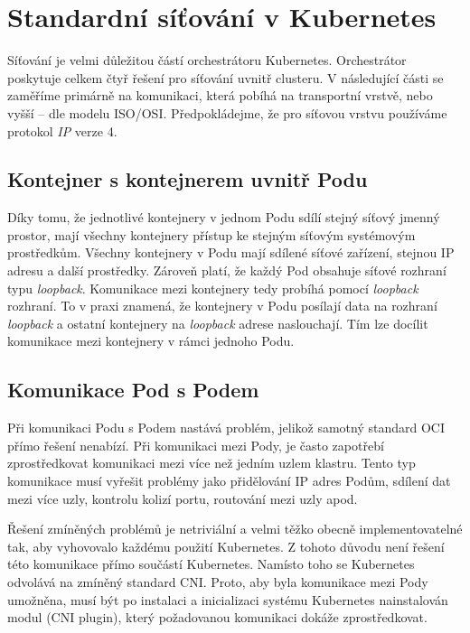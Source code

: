 \section{Standardní síťování v Kubernetes}
Síťování je velmi důležitou částí orchestrátoru Kubernetes. Orchestrátor poskytuje celkem čtyř řešení pro síťování uvnitř clusteru. V následující části se zaměříme primárně na komunikaci, která pobíhá na transportní vrstvě, nebo vyšší -- dle modelu ISO/OSI. Předpokládejme, že pro síťovou vrstvu používáme protokol \textit{IP} verze 4.

\subsection{Kontejner s kontejnerem uvnitř Podu}
Díky tomu, že jednotlivé kontejnery v jednom Podu sdílí stejný síťový jmenný prostor, mají všechny kontejnery přístup ke stejným síťovým systémovým prostředkům. Všechny kontejnery v Podu mají sdílené síťové zařízení, stejnou IP adresu a další prostředky. Zároveň platí, že každý Pod obsahuje síťové rozhraní typu \textit{loopback}. Komunikace mezi kontejnery tedy probíhá pomocí \textit{loopback} rozhraní. To v praxi znamená, že kontejnery v Podu posílají data na rozhraní \textit{loopback} a ostatní kontejnery na \textit{loopback} adrese naslouchají. Tím lze docílit komunikace mezi kontejnery v rámci jednoho Podu.%

\subsection{Komunikace Pod s Podem}
Při komunikaci Podu s Podem nastává problém, jelikož samotný standard OCI přímo řešení nenabízí. Při komunikaci mezi Pody, je často zapotřebí zprostředkovat komunikaci mezi více než jedním uzlem klastru.
Tento typ komunikace musí vyřešit problémy jako přidělování IP adres Podům, sdílení dat mezi více uzly, kontrolu kolizí portu, routování mezi uzly apod.

Řešení zmíněných problémů je netriviální a velmi těžko obecně implementovatelné tak, aby vyhovovalo každému použití Kubernetes. Z tohoto důvodu není řešení této komunikace přímo součástí Kubernetes. Namísto toho se Kubernetes odvolává na zmíněný standard CNI. Proto, aby byla komunikace mezi Pody umožněna, musí být po instalaci a inicializaci systému Kubernetes nainstalován modul (CNI plugin), který požadovanou komunikaci dokáže zprostředkovat.

